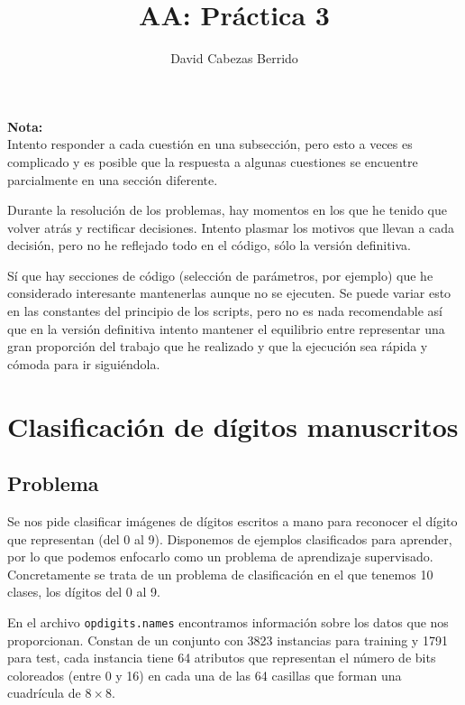 \documentclass[a4]{article}
\title{AA: Práctica 3}
\author{David Cabezas Berrido}
\date{}
\begin{document}
\maketitle
\tableofcontents

\vfill

\textbf{Nota:} \\ Intento responder a cada cuestión en una subsección,
pero esto a veces es complicado y es posible que la respuesta a
algunas cuestiones se encuentre parcialmente en una sección diferente.

Durante la resolución de los problemas, hay momentos en los que he
tenido que volver atrás y rectificar decisiones. Intento plasmar los
motivos que llevan a cada decisión, pero no he reflejado todo en el
código, sólo la versión definitiva.

Sí que hay secciones de código (selección de parámetros, por ejemplo)
que he considerado interesante mantenerlas aunque no se ejecuten. Se
puede variar esto en las constantes del principio de los scripts, pero
no es nada recomendable así que en la versión definitiva intento
mantener el equilibrio entre representar una gran proporción del
trabajo que he realizado y que la ejecución sea rápida y cómoda para
ir siguiéndola.

\newpage

\section{Clasificación de dígitos manuscritos}

\subsection{Problema}

Se nos pide clasificar imágenes de dígitos escritos a mano para
reconocer el dígito que representan (del 0 al 9). Disponemos de
ejemplos clasificados para aprender, por lo que podemos enfocarlo como
un problema de aprendizaje supervisado. Concretamente se trata de un
problema de clasificación en el que tenemos 10 clases, los dígitos del
0 al 9.

En el archivo \texttt{opdigits.names} encontramos información sobre
los datos que nos proporcionan. Constan de un conjunto con 3823
instancias para training y 1791 para test, cada instancia tiene 64
atributos que representan el número de bits coloreados (entre 0 y 16)
en cada una de las 64 casillas que forman una cuadrícula de
$8\times 8$.
\end{document}

